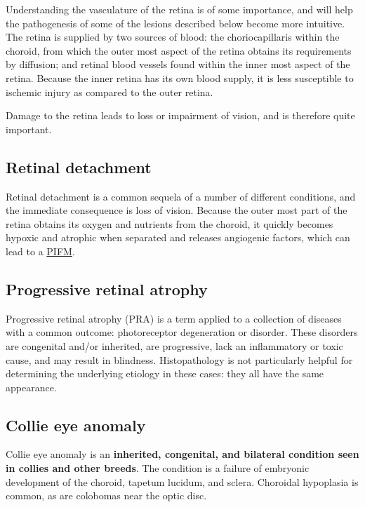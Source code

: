\documentclass[openany]{article}
\begin{document}
Understanding the vasculature of the retina is of some importance, and
will help the pathogenesis of some of the lesions described below become
more intuitive. The retina is supplied by two sources of blood: the
choriocapillaris within the choroid, from which the outer most aspect of
the retina obtains its requirements by diffusion; and retinal blood
vessels found within the inner most aspect of the retina. Because the
inner retina has its own blood supply, it is less susceptible to
ischemic injury as compared to the outer retina.

Damage to the retina leads to loss or impairment of vision, and is
therefore quite important.

\hypertarget{retinal-detachment}{\subsection{Retinal
detachment}\label{retinal-detachment}}

Retinal detachment is a common sequela of a number of different
conditions, and the immediate consequence is loss of vision. Because the
outer most part of the retina obtains its oxygen and nutrients from the
choroid, it quickly becomes hypoxic and atrophic when separated and
releases angiogenic factors, which can lead to a
\protect\hyperlink{pre-iridial-fibrovascular-membranes-pifm}{PIFM}.

\subsection{Progressive retinal
atrophy}\label{progressive-retinal-atrophy}

Progressive retinal atrophy (PRA) is a term applied to a collection of
diseases with a common outcome: photoreceptor degeneration or disorder.
These disorders are congenital and/or inherited, are progressive, lack
an inflammatory or toxic cause, and may result in blindness.
Histopathology is not particularly helpful for determining the
underlying etiology in these cases: they all have the same appearance.

\subsection{Collie eye anomaly}\label{collie-eye-anomaly}

Collie eye anomaly is an \textbf{inherited, congenital, and bilateral
condition seen in collies and other breeds}. The condition is a failure
of embryonic development of the choroid, tapetum lucidum, and sclera.
Choroidal hypoplasia is common, as are colobomas near the optic disc.
\end{document}
